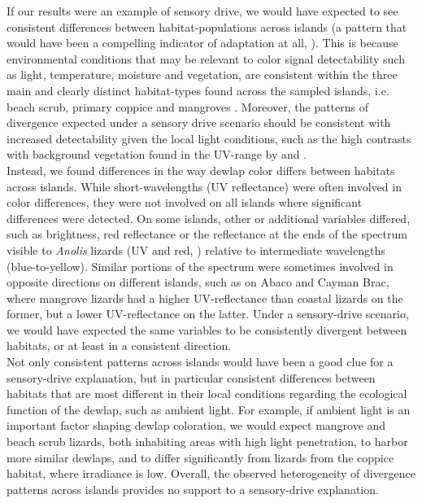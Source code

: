 If our results were an example of sensory drive, we would have expected to see consistent differences between habitat-populations across islands (a pattern that would have been a compelling indicator of adaptation at all, \citealt{Losos2011}). This is because environmental conditions that may be relevant to color signal detectability such as light, temperature, moisture and vegetation, are consistent within the three main and clearly distinct habitat-types found across the sampled islands, i.e. beach scrub, primary coppice and mangroves \citep{Howard1950, Schoener1968}. Moreover, the patterns of divergence expected under a sensory drive scenario should be consistent with increased detectability given the local light conditions, such as the high contrasts with background vegetation found in the UV-range by \citet{Leal2002} and \citet{Leal2004}.\\

Instead, we found differences in the way dewlap color differs between habitats across islands. While short-wavelengths (UV reflectance) were often involved in color differences, they were not involved on all islands where significant differences were detected. On some islands, other or additional variables differed, such as brightness, red reflectance or the reflectance at the ends of the spectrum visible to \textit{Anolis} lizards (UV and red, \citealt{Lazareva2012}) relative to intermediate wavelengths (blue-to-yellow). Similar portions of the spectrum were sometimes involved in opposite directions on different islands, such as on Abaco and Cayman Brac, where mangrove lizards had a higher UV-reflectance than coastal lizards on the former, but a lower UV-reflectance on the latter. Under a sensory-drive scenario, we would have expected the same variables to be consistently divergent between habitats, or at least in a consistent direction.\\

Not only consistent patterns across islands would have been a good clue for a sensory-drive explanation, but in particular consistent differences between habitats that are most different in their local conditions regarding the ecological function of the dewlap, such as ambient light. For example, if ambient light is an important factor shaping dewlap coloration, we would expect mangrove and beach scrub lizards, both inhabiting areas with high light penetration, to harbor more similar dewlaps, and to differ significantly from lizards from the coppice habitat, where irradiance is low. Overall, the observed heterogeneity of divergence patterns across islands provides no support to a sensory-drive explanation.\\

